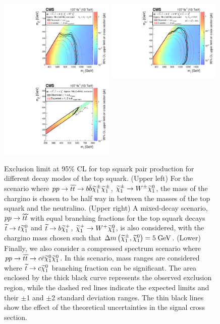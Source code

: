 \begin{figure}[htbp]
 \centering
   \includegraphics[width=0.49\textwidth]{figs/results/T2bW_XSEC_paperXSEC.pdf}
   \includegraphics[width=0.49\textwidth]{figs/results/T2bt_XSEC_paperXSEC.pdf}
   \includegraphics[width=0.49\textwidth]{figs/results/T2cc_XSEC_paperXSEC.pdf}
   \caption{Exclusion limit at 95\% CL for top squark pair production for different decay modes of the top squark.
     (Upper left) For the scenario where $pp\to\widetilde{t}\widetilde{t}\to b\bar{b}\widetilde{\chi}_1^\pm\widetilde{\chi}_1^\pm$, $\widetilde{\chi}_1^\pm\to W^{\pm}{\widetilde{\chi}_1^0}$,
     the mass of the chargino is chosen to be half way in between the masses of the top squark and the neutralino.
     (Upper right) A mixed-decay scenario, $pp\to\widetilde{t}\widetilde{t}$ with equal branching fractions for the top squark decays $\widetilde{t}\to t{\widetilde{\chi}_1^0}$
     and $\widetilde{t}\to b\widetilde{\chi}_1^+$, $\widetilde{\chi}_1^+\to W^{+}{\widetilde{\chi}_1^0}$,
     is also considered, with the chargino mass chosen such that
     $\Delta m\left(\widetilde{\chi}_1^\pm,{\widetilde{\chi}_1^0}\right) = 5\;\text{Ge\hspace{-.08em}V}$.
     (Lower) Finally, we also consider
     a compressed spectrum scenario where
     $pp\to\widetilde{t}\widetilde{t}\to c\bar{c}{\widetilde{\chi}_1^0}{\widetilde{\chi}_1^0}$. In this scenario, mass ranges are considered where $\widetilde{t}\to c{\widetilde{\chi}_1^0}$ branching fraction can be significant.
     The area enclosed by the thick black curve represents the observed exclusion region,
     while the dashed red lines indicate the expected limits and
     their $\pm$1  and $\pm$2
     standard deviation ranges.
     The thin black lines show the effect of the theoretical
     uncertainties in the signal cross section.
   }
   \label{fig:stop_other}
\end{figure}

